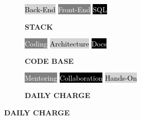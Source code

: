 \documentclass[9pt]{developercv} %
\begin{document}
 \begin{figure}[!ht]
 
\captionsetup[subfigure]{labelformat=empty}
\begin{subfigure}{.3\textwidth}
\centering
{}
{
\colorbox{lightgray}{
\textcolor{black}{Back-End}}
\break
\colorbox{gray}{
\textcolor{white}{Front-End}}
\break
\colorbox{black}{
\textcolor{white}{SQL}}}
\caption{\textbf{STACK}}
\end{subfigure}%
\begin{subfigure}{.3\textwidth}
\centering
{}
{\colorbox{gray}{
\textcolor{white}{Coding}}
\break
\colorbox{lightgray}{
\textcolor{black}{Architecture}}
\break
\colorbox{black}{
\textcolor{white}{Docs}}}
\caption{\textbf{CODE BASE}}
\end{subfigure}%
\begin{subfigure}{.3\textwidth}
\centering
{}
{
\colorbox{gray}{
\textcolor{white}{Mentoring}}
\break
\colorbox{black}{
\textcolor{white}{Collaboration}}
\break
\colorbox{lightgray}{
\textcolor{black}{Hands-On}}}


\caption{\textbf{DAILY CHARGE}}
\end{subfigure}%
\end{figure}


      
     


\end{document}
